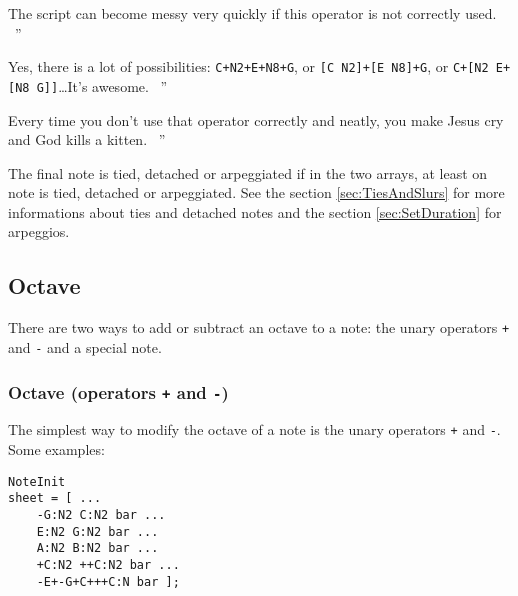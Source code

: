 \documentclass{article}
\newcommand{\wikipedia}{\textsc{Wikipedia}\xspace}
\newcommand{\wiktionary}{\textsc{Wiktionary}\xspace}
\newcommand{\google}{\textsc{Google}\xspace}
\newcommand{\footurl}[1]{\footnote{\url{#1}}\xspace}
\newenvironment{meenv}{ \par \noindent \makebox[6em][r]{ \textcolor{mecolor}{Me}: `` --~}}{~''}
\newenvironment{myselfenv}{ \par \noindent \makebox[6em][r]{ \textcolor{myselfcolor}{Myself}: `` --~}}{~''}
\newcommand{ \me }[1]{%
\begin{meenv}%
	#1%
\end{meenv} }
\newcommand{ \myself }[1]{%
\begin{myselfenv}%
	#1%
\end{myselfenv} }
\begin{document}
\myself{The script can become messy very quickly if this operator is not correctly used.}
\me{Yes, there is a lot of possibilities: \lstinline!C+N2+E+N8+G!, or \lstinline![C N2]+[E N8]+G!, or \lstinline!C+[N2 E+[N8 G]]!\dots It's awesome.}
\myself{Every time you don't use that operator correctly and neatly, you make Jesus cry and God kills a kitten.}%

The final note is tied, detached or arpeggiated if in the two arrays, at least on note is tied, detached or arpeggiated. See the section \ref{sec:TiesAndSlurs} for more informations about ties and detached notes and the section \ref{sec:SetDuration} for arpeggios.


\subsection{Octave}
\label{sec:Octave}

There are two ways to add or subtract an octave to a note: the unary operators \lstinline!+! and \lstinline!-! and a special note.

\subsubsection{Octave (operators \lstinline!+! and \lstinline!-!)}
\label{sec:OctaveOperators}

The simplest way to modify the octave of a note is the unary operators \lstinline!+! and \lstinline!-!. Some examples: \\

\begin{lstlisting}
NoteInit
sheet = [ ...
	-G:N2 C:N2 bar ...
	E:N2 G:N2 bar ...
	A:N2 B:N2 bar ...
	+C:N2 ++C:N2 bar ...
	-E+-G+C+++C:N bar ];
\end{lstlisting}
\end{document}
